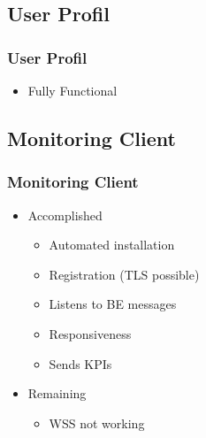 \documentclass[aspectratio=1610,20pt,utf8]{beamer}
\begin{document}

\subsection{User Profil}
\begin{frame}
\frametitle{User Profil}
\begin{itemize}
	\item Fully Functional

\end{itemize}
\end{frame}


\subsection{Monitoring Client}
\begin{frame}
\frametitle{Monitoring Client}
\begin{itemize}
	\item Accomplished
	\begin{itemize}
		\item Automated installation
		\item Registration (TLS possible)
		\item Listens to BE messages
		\item Responsiveness
		\item Sends KPIs
	\end{itemize}
	\item Remaining
	\begin{itemize}
		\item WSS not working
	\end{itemize}
\end{itemize}

\end{frame}

\end{document}
